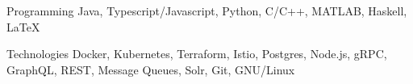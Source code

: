 

\begin{cvskills}

  \cvskill
    {Programming} %
    {Java, Typescript/Javascript, Python, C/C++, MATLAB, Haskell, LaTeX} %

  \cvskill
    {Technologies} %
    {Docker, Kubernetes, Terraform, Istio, Postgres, Node.js, gRPC, GraphQL, REST, Message Queues, Solr, Git, GNU/Linux} %

\end{cvskills}
